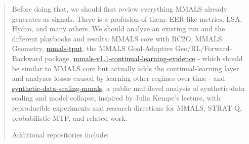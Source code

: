 \begin{quote}
Before doing that, we should first review everything MMALS already generates as signals. There is a profusion of them: EER-like metrics, LSA, Hydro, and many others. We should analyze an existing run and the different playbooks and results: MMALS core with RC2O, MMALS Geometry, \href{https://github.com/gharbonnier78/mmals-tput}{mmals-tput}, the MMALS Goal-Adaptive Geo/RL/Forward-Backward package, \href{https://github.com/gharbonnier78/mmals-v1.1-continual-learning-evidence}{mmals-v1.1-continual-learning-evidence} - which should be similar to MMALS core but actually adds the continual-learning layer and analyzes losses caused by learning other regimes over time - and \href{https://github.com/gharbonnier78/synthetic-data-scaling-mmals}{synthetic-data-scaling-mmals}, a public multilevel analysis of synthetic-data scaling and model collapse, inspired by Julia Kempe's lecture, with reproducible experiments and research directions for MMALS, STRAT-Q, probabilistic MTP, and related work.

Additional repositories include:


\end{quote}
